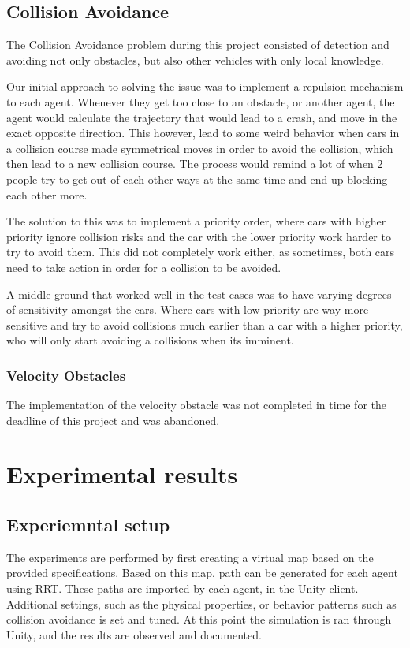 \documentclass[a4paper,12pt]{article}
\begin{document}
\subsection{Collision Avoidance}
\label{sec:pfinding}

The Collision Avoidance problem during this project consisted of detection and avoiding not only obstacles, but also other vehicles with only local knowledge.

Our initial approach to solving the issue was to implement a repulsion mechanism to each agent. Whenever they get too close to an obstacle, or another agent, the agent would calculate the trajectory that would lead to a crash, and move in the exact opposite direction.
This however, lead to some weird behavior when cars in a collision course made symmetrical moves in order to avoid the collision, which then lead to a new collision course. The process would remind a lot of when 2 people try to get out of each other ways at the same time and end up blocking each other more.

The solution to this was to implement a priority order, where cars with higher priority ignore collision risks and the car with the lower priority work harder to try to avoid them. This did not completely work either, as sometimes, both cars need to take action in order for a collision to be avoided. 

A middle ground that worked well in the test cases was to have varying degrees of sensitivity amongst the cars. Where cars with low priority are way more sensitive and try to avoid collisions much earlier than a car with a higher priority, who will only start avoiding a collisions when its imminent.

\subsubsection{Velocity Obstacles}
\label{sec:voI}
The implementation of the velocity obstacle was not completed in time for the deadline of this project and was abandoned.  


\section{Experimental results}
\label{sec:exps}


\subsection{Experiemntal setup}
The experiments are performed by first creating a virtual map based on the provided specifications. Based on this map, path can be generated for each agent using RRT. These paths are imported by each agent, in the Unity client. Additional settings, such as the physical properties, or behavior patterns such as collision avoidance is set and tuned. At this point the simulation is ran through Unity, and the results are observed and documented. 
\end{document}
